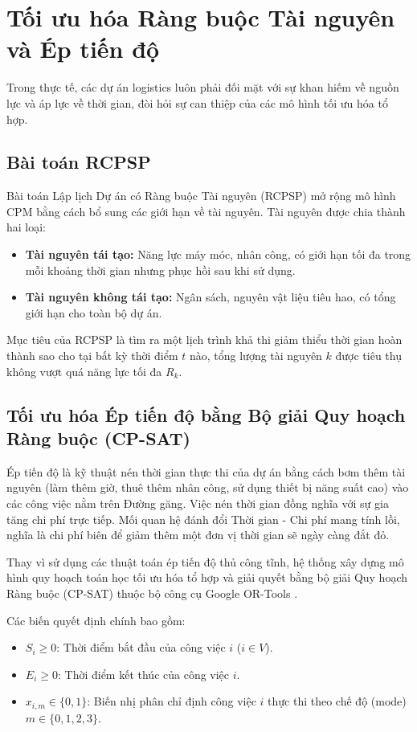 \section{Tối ưu hóa Ràng buộc Tài nguyên và Ép tiến độ}
Trong thực tế, các dự án logistics luôn phải đối mặt với sự khan hiếm về nguồn lực và áp lực về thời gian, đòi hỏi sự can thiệp của các mô hình tối ưu hóa tổ hợp.

\subsection{Bài toán RCPSP}
Bài toán Lập lịch Dự án có Ràng buộc Tài nguyên (RCPSP) \cite{kolisch1997psplib, habibi2018} mở rộng mô hình CPM bằng cách bổ sung các giới hạn về tài nguyên. Tài nguyên được chia thành hai loại:
\begin{itemize}
    \item \textbf{Tài nguyên tái tạo:} Năng lực máy móc, nhân công, có giới hạn tối đa trong mỗi khoảng thời gian nhưng phục hồi sau khi sử dụng.
    \item \textbf{Tài nguyên không tái tạo:} Ngân sách, nguyên vật liệu tiêu hao, có tổng giới hạn cho toàn bộ dự án.
\end{itemize}
Mục tiêu của RCPSP là tìm ra một lịch trình khả thi giảm thiểu thời gian hoàn thành sao cho tại bất kỳ thời điểm $t$ nào, tổng lượng tài nguyên $k$ được tiêu thụ không vượt quá năng lực tối đa $R_k$.

\subsection{Tối ưu hóa Ép tiến độ bằng Bộ giải Quy hoạch Ràng buộc (CP-SAT)}
Ép tiến độ là kỹ thuật nén thời gian thực thi của dự án bằng cách bơm thêm tài nguyên (làm thêm giờ, thuê thêm nhân công, sử dụng thiết bị năng suất cao) vào các công việc nằm trên Đường găng. Việc nén thời gian đồng nghĩa với sự gia tăng chi phí trực tiếp. Mối quan hệ đánh đổi Thời gian - Chi phí mang tính lồi, nghĩa là chi phí biên để giảm thêm một đơn vị thời gian sẽ ngày càng đắt đỏ.

Thay vì sử dụng các thuật toán ép tiến độ thủ công tĩnh, hệ thống xây dựng mô hình quy hoạch toán học tối ưu hóa tổ hợp và giải quyết bằng bộ giải Quy hoạch Ràng buộc (CP-SAT) thuộc bộ công cụ Google OR-Tools \cite{ortools2019}.

Các biến quyết định chính bao gồm:
\begin{itemize}
    \item $S_i \ge 0$: Thời điểm bắt đầu của công việc $i$ ($i \in V$).
    \item $E_i \ge 0$: Thời điểm kết thúc của công việc $i$.
    \item $x_{i,m} \in \{0, 1\}$: Biến nhị phân chỉ định công việc $i$ thực thi theo chế độ (mode) $m \in \{0, 1, 2, 3\}$.
\end{itemize}


